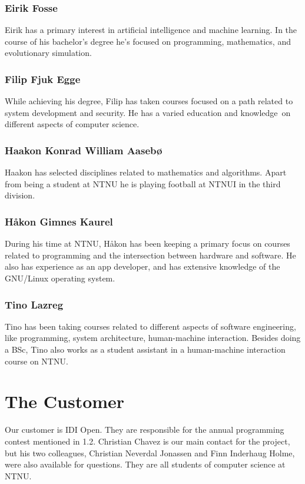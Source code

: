\subsubsection{Eirik Fosse}
Eirik has a primary interest in artificial intelligence and machine
learning. In the course of his bachelor's degree
he's focused on programming, mathematics, and
evolutionary simulation.

\subsubsection{Filip Fjuk Egge}
While achieving his degree, Filip has taken courses focused on a path
related to system development and security. He has a varied education
and knowledge\ on different aspects of computer science. 

\subsubsection{Haakon Konrad William Aasebø}
Haakon has selected disciplines related to mathematics and algorithms.
Apart from being a student at NTNU he is playing football at NTNUI in
the third division. 

\subsubsection{Håkon Gimnes Kaurel}
During his time at NTNU, Håkon has been keeping a primary focus on
courses related to programming and the intersection between hardware and
software. He also has experience as an app developer, and has extensive
knowledge of the GNU/Linux operating system. 

\subsubsection{Tino Lazreg}
Tino has been taking courses related to different aspects of software
engineering, like programming, system architecture, human-machine
interaction. Besides doing a BSc, Tino also works as a student
assistant in a human-machine interaction course on NTNU. 

\section{The Customer}
Our customer is IDI Open. They are responsible for the annual
programming contest mentioned in 1.2. Christian Chavez is our main contact for
the project, but his two colleagues, Christian Neverdal Jonassen and Finn
Inderhaug Holme, were
also available for questions. They are all students of computer science
at NTNU. 

